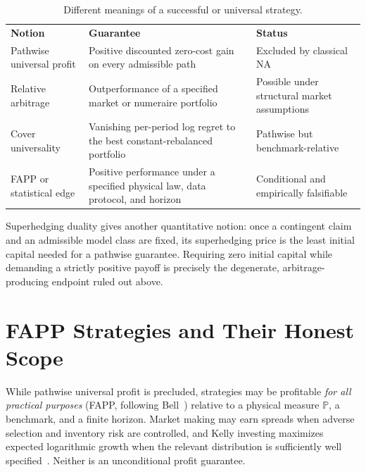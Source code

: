 \documentclass[aps,pra,reprint,superscriptaddress,amsmath,amssymb,floatfix]{revtex4-2}
\theoremstyle{plain}
\theoremstyle{definition}
\theoremstyle{remark}
\begin{document}
\begin{table}[ht]
\caption{\label{tab:hierarchy}Different meanings of a successful or universal strategy.}
\centering
\begin{ruledtabular}
\begin{tabular}{p{}p{}p{}}
\textbf{Notion} & \textbf{Guarantee} & \textbf{Status} \\
\colrule
Pathwise universal profit
& Positive discounted zero-cost gain on every admissible path
& Excluded by classical NA \\
Relative arbitrage
& Outperformance of a specified market or numeraire portfolio
& Possible under structural market assumptions \\
Cover universality
& Vanishing per-period log regret to the best constant-rebalanced portfolio
& Pathwise but benchmark-relative \\
FAPP or statistical edge
& Positive performance under a specified physical law, data protocol, and horizon
& Conditional and empirically falsifiable \\
\end{tabular}
\end{ruledtabular}
\end{table}

Superhedging duality gives another quantitative notion: once a contingent
claim and an admissible model class are fixed, its superhedging price is the
least initial capital needed for a pathwise guarantee. Requiring zero initial
capital while demanding a strictly positive payoff is precisely the
degenerate, arbitrage-producing endpoint ruled out above.

\section{FAPP Strategies and Their Honest Scope}
\label{sec:fapp}

While pathwise universal profit is precluded, strategies may be profitable
\emph{for all practical purposes} (FAPP, following Bell~\cite{bell-a})
relative to a physical measure \(\mathbb{P}\), a benchmark, and a finite
horizon. Market making may earn spreads when adverse selection and inventory
risk are controlled, and Kelly investing maximizes expected logarithmic
growth when the relevant distribution is sufficiently well
specified~\cite{Kelly1956}. Neither is an unconditional profit guarantee.
\end{document}
